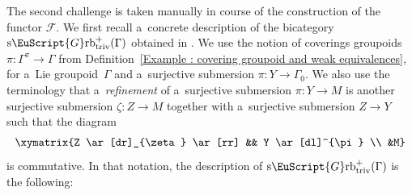 \documentclass[pdftex]{sigma}
\numberwithin{equation}{section}
\def\mathscr#1{\EuScript{#1}}
\newcommand{\alxydim}[2]{\begin{aligned}\xymatrix#1{#2}\end{aligned}}
\newcommand{\Grbtriv}{\mathscr{G}\mathrm{rb}_{\mathrm{triv}}}
\newcommand{\sGrbtriv}{\mathrm{s}\Grbtriv}
\begin{document}
The second challenge is taken manually in course of the construction of the functor $\mathcal{F}$.
We first recall a~concrete description of the bicategory $\sGrbtriv^{+}(\Gamma)$ obtained in \cite[Proposition 9.1]{nikolaus2}.
We use the notion of coverings groupoids $\pi\colon \Gamma^{\pi}\to \Gamma$ from Definition~\ref{Example : covering groupoid and weak equivalences}, for a~Lie groupoid~$\Gamma$ and a~surjective submersion $\pi\colon Y \to \Gamma_0$. We also use the terminology that a~\emph{refinement} of a~surjective submersion $\pi\colon Y \to M$ is another surjective submersion $\zeta\colon Z \to M$ together with a~surjective submersion $Z \to Y$ such that the diagram
\begin{equation*}
\alxydim{}{Z \ar[dr]_{\zeta} \ar[rr] && Y \ar[dl]^{\pi} \\ &M}
\end{equation*}
is commutative. In that notation, the description of $\sGrbtriv^{+}(\Gamma)$ is the following:
\end{document}
